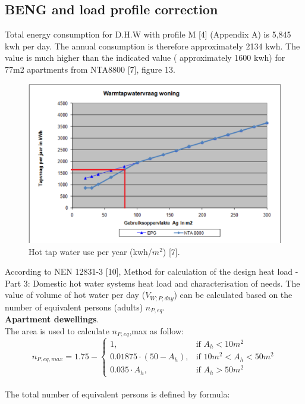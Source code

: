 \documentclass[a4paper,10pt]{article}
\begin{document}


\subsection{BENG and load profile correction}

Total energy consumption for D.H.W with profile M [4] (Appendix A) is 5,845 kwh per day. The annual consumption is therefore approximately 2134 kwh. The value is much higher than the indicated value ( approximately 1600 kwh) for 77m2 apartments from NTA8800 [7], figure 13.

\begin{figure}[H]
\centering
\includegraphics[width=1\columnwidth]{pictures/NTA_8800_DHW.png}
\caption[Short title]{Hot tap water use per year (kwh/$m^2$) [7].}
\label{fig:ff13}\end{figure}

According to NEN 12831-3 [10], Method for calculation of the design heat load - Part 3:  Domestic hot water systems heat load and characterisation of needs. The value of volume of hot water per day ($V_{W;P;day}$) can be calculated based on the number of equivalent persons (adults) $n_{P,eq}$.
\vspace{2mm}
\\
\textbf{Apartment dewellings}.\\
The area is used to calculate $n_{P,eq}$,max as follow: 
\begin{equation}
    n_{P,eq,max}= 1.75 - \begin{cases}
			1, & \text{if $A_{h} < 10 m^2$}\\
            0.01875\cdot(50 - A_h), & \text{if $10 m^2 <A_{h} < 50 m^2$}\\
            0.035\cdot A_h, & \text{if $A_{h} > 50 m^2$}
		 \end{cases}
\end{equation}\\
The total number of equivalent persons is defined by formula:
\end{document}

